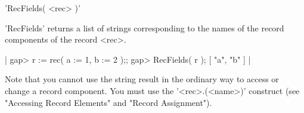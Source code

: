 %

'RecFields( <rec> )'

'RecFields' returns a  list of strings corresponding  to the names of the
record components of the record <rec>.

|    gap> r := rec( a := 1, b := 2 );;
    gap> RecFields( r );
    [ "a", "b" ] |

Note that you cannot use the string result in the  ordinary way to access
or   change  a  record  component.  You  must    use the '<rec>.(<name>)'
construct (see "Accessing Record Elements" and "Record Assignment").




